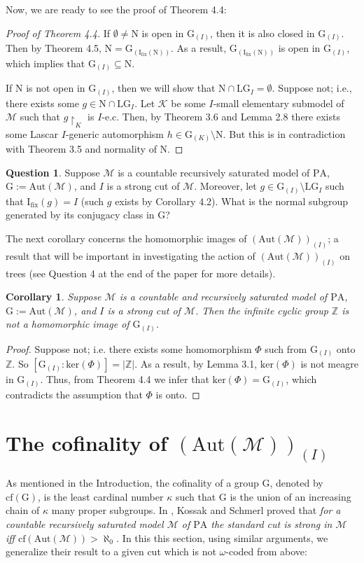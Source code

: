 \documentclass[11pt]{article}
\theoremstyle{plain}
\newtheorem{cor}[theorem]{Corollary}
\theoremstyle{definition}
\newtheorem{q}{Question}
\newcommand{\M}{\mathcal{M}}
\newcommand{\K}{\mathcal{K}}
\newcommand{\I}{\mathrm{I_{fix}}}
\newcommand{\G}{\mathrm{G}}
\newcommand{\A}{\mathrm{Aut}}
\newcommand{\pa}{\mathrm{PA}}
\newcommand{\LG}{\mathrm{LG}}
\begin{document}
Now, we are ready to see the proof of Theorem 4.4:
\begin{proof}[Proof of Theorem 4.4]
	If $\emptyset\neq\mathrm{N}$ is open in $\G_{(I)}$, then it is also closed in $\G_{(I)}$. Then by Theorem 4.5, $\mathrm{N}=\G_{(\I(\mathrm{N}))}$.  As a result, $\G_{(\I(\mathrm{N}))} $ is open in $\G_{(I)}$, which implies that  $\G_{(I)}\subseteq\mathrm{N}$.

If $\mathrm{N}$ is not open in $\G_{(I)}$, then we will show that $\mathrm{N}\cap\LG_{I}=\emptyset$. Suppose not; i.e., there exists some $g\in\mathrm{N}\cap\LG_{I}$. Let $\K$ be some $I$-small elementary submodel of $\M$ such that $g\upharpoonright_{K}$ is $I$-e.c.  Then, by Theorem 3.6 and Lemma 2.8  there exists some Lascar $I$-generic automorphism $h\in \G_{(K)}\setminus\mathrm{N}$. But this is in contradiction with Theorem 3.5 and normality of $\mathrm{N}$.
\end{proof} 
\begin{q}
	Suppose $\M$ is a countable recursively saturated model of $\pa$, $\G:=\A(\M)$, and $I$ is a strong cut of $\M$. Moreover,	let $g\in\G_{(I)}\setminus\LG_{I}$ such that $\I(g)=I$ (such $g$ exists by Corollary 4.2). What is the normal subgroup generated by its conjugacy class in $\G$? 
\end{q}
 The next corollary concerns the homomorphic images of $(\A(\M))_{(I)}$; a result that will be important in investigating the action of $(\A(\M))_{(I)}$ on trees (see Question 4 at the end of the paper for more details).
\begin{cor}
	Suppose $\M$ is a countable and recursively saturated model of $\pa$, ${\G:=\A(\M)}$, and $I$ is a strong cut of $\M$. Then the infinite cyclic group $\mathbb{Z}$ is not a homomorphic image of $\G_{(I)}$.
\end{cor}
\begin{proof}
	Suppose not; i.e. there exists some homomorphism $\Phi$ such from $\G_{(I)}$ onto $\mathbb{Z}$. So ${[\G_{(I)}:\mathrm{ker}(\Phi)]=|\mathbb{Z}|}$.   As a result,  by Lemma 3.1, $\mathrm{ker}(\Phi) $ is not meagre in $\G_{(I)}$. Thus, from Theorem 4.4 we infer that $\mathrm{ker}(\Phi)=\G_{(I)}$, which  contradicts the assumption that $\Phi$ is onto.
\end{proof}






\section{The cofinality of $(\A(\M))_{(I)}$}
As mentioned in the Introduction, the cofinality of a group $\G$, denoted by $\mathrm{cf}(\G)$, is the least cardinal number $\kappa$ such that $\G$ is the union of an increasing chain of $\kappa$ many proper subgroups. In \cite{ks}, Kossak and Schmerl proved that \textit{for a countable recursively saturated model $\M$ of $\pa$ the standard cut is strong in $\M$ iff $\mathrm{cf}(\A(\M))>\aleph_{0}$.} In this this section, using similar arguments,  we generalize their result  to a given cut which is not $\omega$-coded from above:
\end{document}
